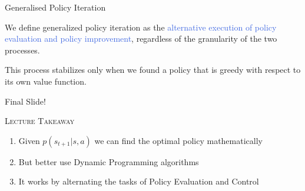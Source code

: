 \documentclass{beamer}
\newenvironment{takeaway}[1]{%
	\definecolor{shadecolor}{gray}{0.9}%
		\begin{shaded}{\color{skymagenta}\noindent\textsc{#1}}\\%
		}{%
		\end{shaded}%
}
\begin{document}
\begin{frame}{Generalised Policy Iteration}

We define generalized policy iteration as the \textcolor{RoyalBlue}{alternative execution of policy evaluation and policy improvement}, regardless of the granularity of the two processes.

\hspace{2mm}

This process stabilizes only when we found a policy that is greedy with respect to its own value function.

\end{frame}


\begin{frame}{Final Slide!}
	\begin{takeaway}{Lecture Takeaway}
		\begin{enumerate}
			\item Given $p(s_{t+1}|s,a)$ we can find the optimal policy mathematically
			\item But better use Dynamic Programming algorithms
			\item It works by alternating the tasks of Policy Evaluation and Control
		\end{enumerate}
	\end{takeaway}
\end{frame}
\end{document}

